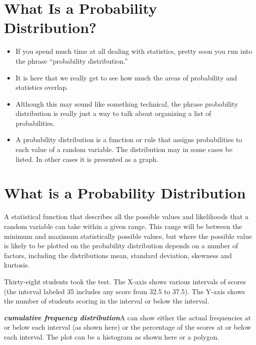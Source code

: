 \documentclass[a4paper,12pt]{article}
\begin{document}
\section{What Is a Probability Distribution?}
\begin{itemize}
\item If you spend much time at all dealing with statistics, pretty soon you run into the phrase “probability distribution.” 
\item It is here that we really get to see how much the areas of probability and statistics overlap.
\item  Although this may sound like something technical, the phrase probability distribution is really just a way to talk about organizing a list of probabilities. 

\item A probability distribution is a function or rule that assigns probabilities to each value of a random variable. The distribution may in some cases be listed. In other cases it is presented as a graph.
\end{itemize}

\section{What is a Probability Distribution}

A statistical function that describes all the possible values and likelihoods that a random variable can take within a given range. This range will be between the minimum and maximum statistically possible values, but where the possible value is likely to be plotted on the probability distribution depends on a number of factors, including the distributions mean, standard deviation, skewness and kurtosis.


Thirty-eight students took the test. The X-axis shows various intervals of scores (the interval labeled 35 includes any score from 32.5 to 37.5). The Y-axis shows the number of students scoring in the interval or below the interval.

\textbf{\emph{cumulative frequency distribution}}A  can show either the actual frequencies at or below each interval (as shown here) or the percentage of the scores at or below each interval. The plot can be a histogram as shown here or a polygon.

\end{document}
